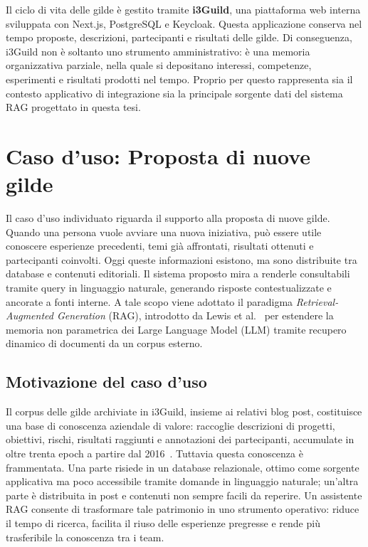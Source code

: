 Il ciclo di vita delle gilde è gestito tramite \textbf{i3Guild}, una
piattaforma web interna sviluppata con Next.js, PostgreSQL e Keycloak. Questa
applicazione conserva nel tempo proposte, descrizioni, partecipanti e risultati
delle gilde. Di conseguenza, i3Guild non è soltanto uno strumento
amministrativo: è una memoria organizzativa parziale, nella quale si depositano
interessi, competenze, esperimenti e risultati prodotti nel tempo. Proprio per
questo rappresenta sia il contesto applicativo di integrazione sia la
principale sorgente dati del sistema RAG progettato in questa tesi.

\section{Caso d'uso: Proposta di nuove gilde}
\label{sec:use_case_intre}

Il caso d'uso individuato riguarda il supporto alla proposta di nuove gilde.
Quando una persona vuole avviare una nuova iniziativa, può essere utile
conoscere esperienze precedenti, temi già affrontati, risultati ottenuti e
partecipanti coinvolti. Oggi queste informazioni esistono, ma sono distribuite
tra database e contenuti editoriali. Il sistema proposto mira a renderle
consultabili tramite query in linguaggio naturale, generando risposte
contestualizzate e ancorate a fonti interne. A tale scopo viene adottato il
paradigma \emph{Retrieval-Augmented Generation} (RAG), introdotto da Lewis et
al.~\cite{lewis2020retrieval} per estendere la memoria non parametrica dei Large
Language Model (LLM) tramite recupero dinamico di documenti da un corpus
esterno.

\subsection{Motivazione del caso d'uso}

Il corpus delle gilde archiviate in i3Guild, insieme ai relativi blog post,
costituisce una base di conoscenza aziendale di valore: raccoglie descrizioni di
progetti, obiettivi, rischi, risultati raggiunti e annotazioni dei partecipanti,
accumulate in oltre trenta epoch a partire dal 2016~\cite{intre_gilde}. Tuttavia
questa conoscenza è frammentata. Una parte risiede in un database relazionale,
ottimo come sorgente applicativa ma poco accessibile tramite domande in
linguaggio naturale; un'altra parte è distribuita in post e contenuti non
sempre facili da reperire. Un assistente RAG consente di trasformare tale
patrimonio in uno strumento operativo: riduce il tempo di ricerca, facilita il
riuso delle esperienze pregresse e rende più trasferibile la conoscenza tra i
team.

